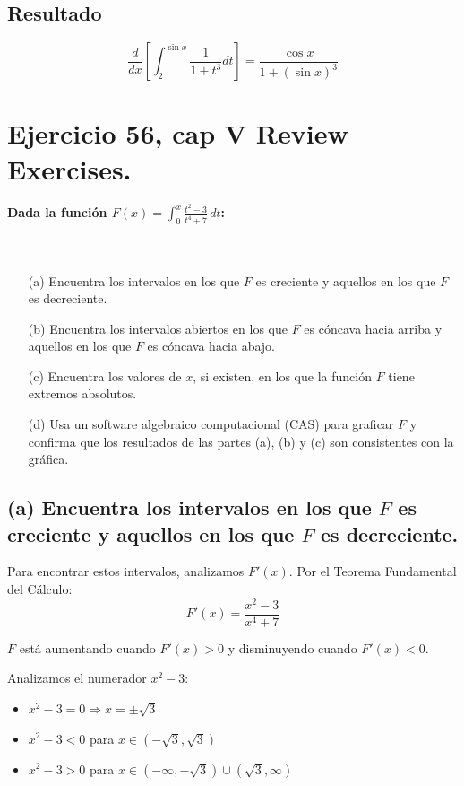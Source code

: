 \documentclass[11pt,letterpaper]{article}
\begin{document}
\subsection*{Resultado}
\[
\boxed{\frac{d}{dx}\left[\int_{2}^{\sin x} \frac{1}{1+t^3} dt\right] = \frac{\cos x}{1+(\sin x)^3}}
\]



\section{Ejercicio 56, cap V Review Exercises.}
\paragraph*{Dada la función \( F(x) = \int_0^x \frac{t^2 - 3}{t^4 + 7} \, dt \):}
\\
\begin{enumerate}
    \item[(a)] Encuentra los intervalos en los que \( F \) es creciente y aquellos en los que \( F \) es decreciente.
    \item[(b)] Encuentra los intervalos abiertos en los que \( F \) es cóncava hacia arriba y aquellos en los que \( F \) es cóncava hacia abajo.
    \item[(c)] Encuentra los valores de \( x \), si existen, en los que la función \( F \) tiene extremos absolutos.
    \item[(d)] Usa un software algebraico computacional (CAS) para graficar \( F \) y confirma que los resultados de las partes (a), (b) y (c) son consistentes con la gráfica.
\end{enumerate}

\subsection*{(a) Encuentra los intervalos en los que \( F \) es creciente y aquellos en los que \( F \) es decreciente.}

Para encontrar estos intervalos, analizamos $F'(x)$. Por el Teorema Fundamental del Cálculo:
\[F'(x) = \frac{x^2-3}{x^4+7}\]

$F$ está aumentando cuando $F'(x) > 0$ y disminuyendo cuando $F'(x) < 0$.

Analizamos el numerador $x^2-3$:
\begin{itemize}
    \item $x^2-3 = 0 \Rightarrow x = \pm\sqrt{3}$
    \item $x^2-3 < 0$ para $x \in (-\sqrt{3}, \sqrt{3})$
    \item $x^2-3 > 0$ para $x \in (-\infty, -\sqrt{3}) \cup (\sqrt{3}, \infty)$
\end{itemize}
\end{document}
